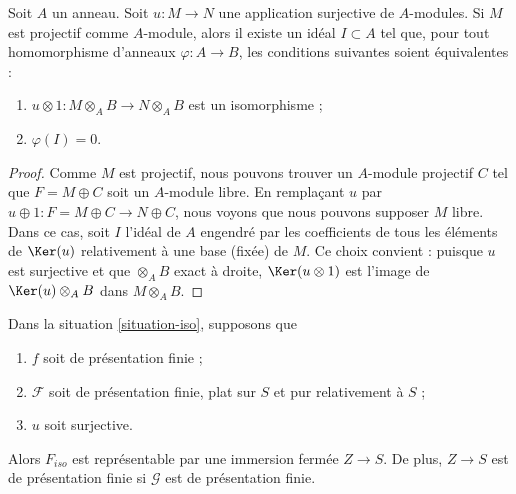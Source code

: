 \begin{lemma}
\label{lemma-flattening-module-map}
Soit $A$ un anneau. Soit $u : M \to N$ une application surjective de $A$-modules.
Si $M$ est projectif comme $A$-module, alors il existe un idéal
$I \subset A$ tel que, pour tout homomorphisme d'anneaux $\varphi : A \to B$,
les conditions suivantes soient équivalentes :
\begin{enumerate}
\item $u \otimes 1 : M \otimes_A B \to N \otimes_A B$ est un
isomorphisme ;
\item $\varphi(I) = 0$.
\end{enumerate}
\end{lemma}

\begin{proof}
Comme $M$ est projectif, nous pouvons trouver un $A$-module projectif $C$
tel que $F = M \oplus C$ soit un $A$-module libre.
En remplaçant $u$ par $u \oplus 1 : F = M \oplus C \to N \oplus C$,
nous voyons que nous pouvons supposer $M$ libre. Dans ce cas, soit $I$
l'idéal de $A$ engendré par les coefficients de tous les éléments de
$\Ker(u)$ relativement à une base (fixée) de $M$.
Ce choix convient : puisque $u$ est surjective et que
$\otimes_A B$ exact à droite, $\Ker(u \otimes 1)$ est
l'image de $\Ker(u) \otimes_A B$ dans $M \otimes_A B$.
\end{proof}

\begin{theorem}
\label{theorem-flattening-map}
Dans la
situation \ref{situation-iso},
supposons que
\begin{enumerate}
\item $f$ soit de présentation finie ;
\item $\mathcal{F}$ soit de présentation finie, plat sur $S$ et
pur relativement à $S$ ;
\item $u$ soit surjective.
\end{enumerate}
Alors $F_{iso}$ est représentable par une immersion fermée $Z \to S$.
De plus, $Z \to S$ est de présentation finie si $\mathcal{G}$ est
de présentation finie.
\end{theorem}

